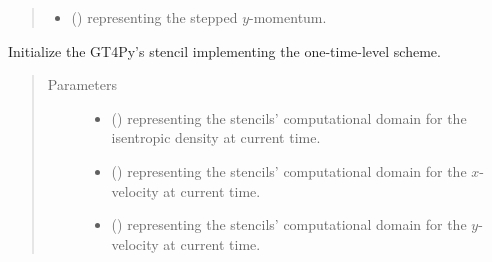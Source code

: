 \documentclass[letterpaper,10pt,english]{sphinxmanual}
\begin{document}
\begin{fulllineitems}
\begin{fulllineitems}
\begin{quote}
\begin{description}
\begin{itemize}
\item {} 
 () \textendash{}  representing the stepped \(y\)-momentum.

\end{itemize}


\end{description}\end{quote}

\end{fulllineitems}


\begin{fulllineitems}
\label{\detokenize{api:dycore.prognostic_isentropic.PrognosticIsentropicTL1._initialize_stencils}}
Initialize the GT4Py’s stencil implementing the one-time-level scheme.
\begin{quote}\begin{description}
\item[{Parameters}] \leavevmode\begin{itemize}
\item {} 
 () \textendash{}  representing the stencils’ computational domain for the isentropic density
at current time.

\item {} 
 () \textendash{}  representing the stencils’ computational domain for the \(x\)-velocity
at current time.

\item {} 
 () \textendash{}  representing the stencils’ computational domain for the \(y\)-velocity
at current time.

\end{itemize}

\end{description}\end{quote}


\end{fulllineitems}
\end{fulllineitems}
\end{document}
